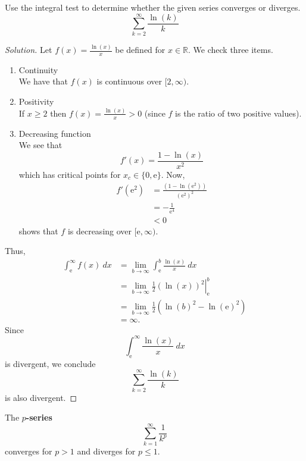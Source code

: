 \documentclass[compacto,10pt,comentarios]{aleph-notas}
\begin{document}
\begin{ejer}
    Use the integral test to determine whether the given series converges or diverges.
    $$
        \sum_{k=2}^{\infty} \frac{\ln(k)}{k}
    $$
\end{ejer}
\begin{proof}[Solution]
    Let $f(x) = \frac{\ln(x)}{x}$ be defined for $x \in \mathbb{R}$. We check three items.
    \begin{enumerate}
        \item Continuity \\
        We have that $f(x)$ is continuous over $[2, \infty)$.
        \item Positivity \\
        If $x \geq 2$ then $f(x) = \frac{\ln(x)}{x} > 0$ (since $f$ is the ratio of two positive values).
        \item Decreasing function \\
        We see that
        $$
            f'(x) = \frac{1-\ln(x)}{x^2}
        $$
        which has critical points for $x_c \in \{0, \mathrm{e}\}$. Now,
        \begin{align*}
            f'(\mathrm{e}^2)
                & = \frac{(1 - \ln(\mathrm{e}^{2}))}{(\mathrm{e}^{2})^2} \\
                & = -\frac{1}{\mathrm{e}^{4}} \\
                & < 0
        \end{align*}
        shows that $f$ is decreasing over $[\mathrm{e}, \infty)$.
    \end{enumerate}
    Thus,
    \begin{align*}
        \int_{\mathrm{e}}^{\infty} f(x) ~ dx 
            & = \lim_{b \to \infty} \int_{\mathrm{e}}^{b} \frac{\ln(x)}{x} ~ dx  \\
            & = \lim_{b \to \infty} \left. \frac{1}{2} \left( \ln(x) \right)^{2} \right\rvert_{\mathrm{e}}^{b} \\
            & = \lim_{b \to \infty} \frac{1}{2} \left( \ln(b)^{2} - \ln(\mathrm{e})^2 \right) \\
            & = \infty.
    \end{align*}
    Since
    $$
        \int_{\mathrm{e}}^{\infty} \frac{\ln(x)}{x} ~ dx
    $$
    is divergent, we conclude
    $$
        \sum_{k=2}^{\infty} \frac{\ln(k)}{k}
    $$
    is also divergent.
\end{proof}

\begin{teo}
    The \textbf{$p$-series}
    $$
        \sum_{k=1}^{\infty} \frac{1}{k^{p}}
    $$
    converges for $p > 1$ and diverges for $p \leq 1$.
\end{teo}
\end{document}
